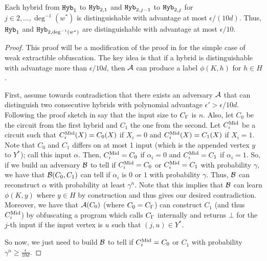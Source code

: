 \begin{lemma}
	\label{lemma:hybB}
	Each hybrid from $\texttt{Hyb}_1$ to $\texttt{Hyb}_{2, 1}$ and $\texttt{Hyb}_{2, j - 1}$ to $\texttt{Hyb}_{2, j}$ for $j \in 2, \dots, \deg^{-1}(w^*)$
	is distinguishable with advantage at most $\epsilon / (10d)$. Thus, $\texttt{Hyb}_1$ and $\texttt{Hyb}_{2, \deg^{-1}(w^*)}$ are distinguishable with advantage at most $\epsilon / 10$.
	\begin{proof}
		This proof will be a modification of the proof in \cite{ishai2015public} for the simple case of weak extractible obfuscation.
		The key idea is that if a hybrid is distinguishable with advantage more than $\epsilon / 10d$, then
		$\mathcal{A}$ can produce a label $\phi(K, h)$ for $h \in H$.

		First, assume towards contradiction that there exists an adversary $\mathcal{A}$ that can distinguish two consecutive hybrids
		with polynomial advantage $\epsilon' > \epsilon / 10d$.
		Following the proof sketch in \cite{ishai2015public} say that the input size to $C_\Gamma$ is $n$.
		Also, let $C_0$ be the circuit from the first hybrid and $C_1$ the one from the second.
		Let $C^{\text{Mid}}_i$ be a circuit such that $C^{\text{Mid}}_i(X) = C_0(X)$ if $X_i = 0$ and $C^{\text{Mid}}_i(X) = C_1(X)$ if $X_i = 1$.
		Note that $C_0$ and $C_1$ differs on at most 1 input (which is the appended vertex $y$ to $Y^*$);
		call this input $\alpha$.
		Then, $C^{\text{Mid}}_i = C_0$ if $\alpha_i = 0$ and $C^{\text{Mid}}_i = C_1$ if $\alpha_i = 1$.
		So, if we build an adversary $\mathcal{B}$ to tell if $C^{\text{Mid}}_i = C_0$ or $C^{\text{Mid}}_i = C_1$ with probability $\gamma$,
		we have that $\mathcal{B}(C_0, C_1)$ can tell if $\alpha_i$ is $0$ or $1$ with probability $\gamma$.
		Thus, $\mathcal{B}$ can reconstruct $\alpha$ with probability at least $\gamma^n$.
		Note that this implies that $\mathcal{B}$ can learn $\phi(K, y)$ where $y \in H$ by construction
		and thus gives our desired contradiction.
		Moreover, we have that $\mathcal{A}(C_0)$ (where $C_0 = C_\Gamma$) can construct $C_1$ (and thus $C^{\text{Mid}}_i$)
		by obfuscating a program which calls $C_\Gamma$ internally and returns $\bot$ for the $j$-th input
		if the input vertex is $u$ such that $(j, u) \in Y^*$.

		So now, we just need to build $\mathcal{B}$ to tell if $C^{\text{Mid}}_i = C_0$ or $C_1$ with probability $\gamma^n \geq \frac{\epsilon}{10d}$.


\end{proof}
\end{lemma}
